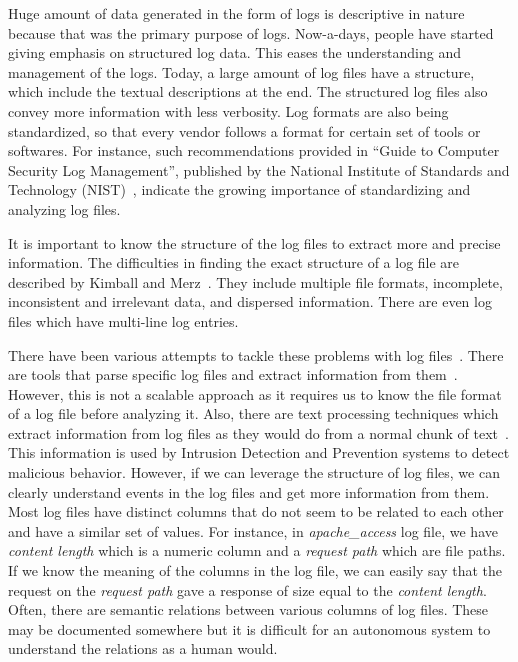 Huge amount of data generated in the form of logs is descriptive in nature because that was the primary purpose of logs. Now-a-days, people have started giving emphasis on structured log data. This eases the understanding and management of the logs. Today, a large amount of log files have a structure, which include the textual descriptions at the end. The structured log files also convey more information with less verbosity. Log formats are also being standardized, so that every vendor follows a format for certain set of tools or softwares. For instance, such recommendations provided in ``Guide to Computer Security Log Management'', published by the National Institute of Standards and Technology (NIST)~\cite{nist_guide}, indicate the growing importance of standardizing and analyzing log files.

It is important to know the structure of the log files to extract more and precise information. The difficulties in finding the exact structure of a log file are described by Kimball and Merz~\cite{kimball_log_problem}. They include multiple file formats, incomplete, inconsistent and irrelevant data, and dispersed information. There are even log files which have multi-line log entries.

There have been various attempts to tackle these problems with log files~\cite{log_parser_2005}. There are tools that parse specific log files and extract information from them~\cite{weblog_expert}. However, this is not a scalable approach as it requires us to know the file format of a log file before analyzing it. Also, there are text processing techniques which extract information from log files as they would do from a normal chunk of text~\cite{saneifar2009terminology}. This information is used by Intrusion Detection and Prevention systems to detect malicious behavior. However, if we can leverage the structure of log files, we can clearly understand events in the log files and get more information from them. Most log files have distinct columns that do not seem to be related to each other and have a similar set of values. For instance, in \textit{apache\_access} log file, we have \textit{content length} which is a numeric column and a \textit{request path} which are file paths. If we know the meaning of the columns in the log file, we can easily say that the request on the \textit{request path} gave a response of size equal to the \textit{content length}. Often, there are semantic relations between various columns of log files. These may be documented somewhere but it is difficult for an autonomous system to understand the relations as a human would.

